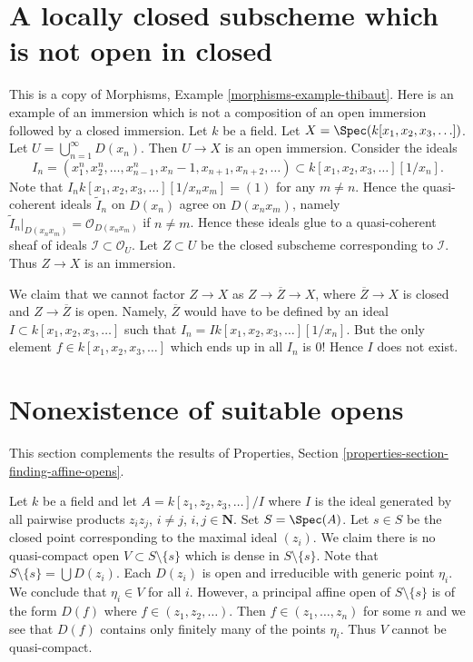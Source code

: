 \section{A locally closed subscheme which is not open in closed}
\label{section-strange-immersion}

\noindent
This is a copy of
Morphisms, Example \ref{morphisms-example-thibaut}.
Here is an example of an immersion which is not a composition of an
open immersion followed by a closed immersion.
Let $k$ be a field.
Let $X = \Spec(k[x_1, x_2, x_3, \ldots])$.
Let $U = \bigcup_{n = 1}^{\infty} D(x_n)$.
Then $U \to X$ is an open immersion.
Consider the ideals
$$
I_n =
(x_1^n, x_2^n, \ldots, x_{n - 1}^n, x_n - 1, x_{n + 1}, x_{n + 2}, \ldots)
\subset
k[x_1, x_2, x_3, \ldots][1/x_n].
$$
Note that $I_n k[x_1, x_2, x_3, \ldots][1/x_nx_m] = (1)$
for any $m \not = n$. Hence the quasi-coherent ideals
$\widetilde I_n$ on $D(x_n)$ agree on $D(x_nx_m)$, namely
$\widetilde I_n|_{D(x_nx_m)} = \mathcal{O}_{D(x_n x_m)}$ if
$n \not = m$. Hence these ideals glue to a quasi-coherent sheaf of ideals
$\mathcal{I} \subset \mathcal{O}_U$.
Let $Z \subset U$ be the closed subscheme corresponding to
$\mathcal{I}$. Thus $Z \to X$ is an immersion.

\medskip\noindent
We claim that we cannot factor $Z \to X$ as
$Z \to \overline{Z} \to X$, where $\overline{Z} \to X$ is closed
and $Z \to \overline{Z}$ is open. Namely, $\overline{Z}$ would
have to be defined by an ideal $I \subset k[x_1, x_2, x_3, \ldots]$
such that $I_n = I k[x_1, x_2, x_3, \ldots][1/x_n]$.
But the only element $f \in k[x_1, x_2, x_3, \ldots]$
which ends up in all $I_n$ is $0$! Hence $I$ does not exist.




\section{Nonexistence of suitable opens}
\label{section-nonexistence-opens}

\noindent
This section complements the results of
Properties, Section \ref{properties-section-finding-affine-opens}.

\medskip\noindent
Let $k$ be a field and let $A = k[z_1, z_2, z_3, \ldots]/I$ where $I$
is the ideal generated by all pairwise products
$z_iz_j$, $i \not = j$, $i, j \in \mathbf{N}$. Set $S = \Spec(A)$.
Let $s \in S$ be the closed point corresponding to the maximal
ideal $(z_i)$. We claim there is no
quasi-compact open $V \subset S \setminus \{s\}$ which is
dense in $S \setminus \{s\}$. Note that $S \setminus \{s\} = \bigcup D(z_i)$.
Each $D(z_i)$ is open and irreducible with generic point
$\eta_i$. We conclude that $\eta_i \in V$ for all $i$.
However, a principal affine open of $S \setminus \{s\}$ is
of the form $D(f)$ where $f \in (z_1, z_2, \ldots)$. Then
$f \in (z_1, \ldots, z_n)$ for some $n$ and we see that $D(f)$ contains
only finitely many of the points $\eta_i$. Thus $V$ cannot be quasi-compact.

